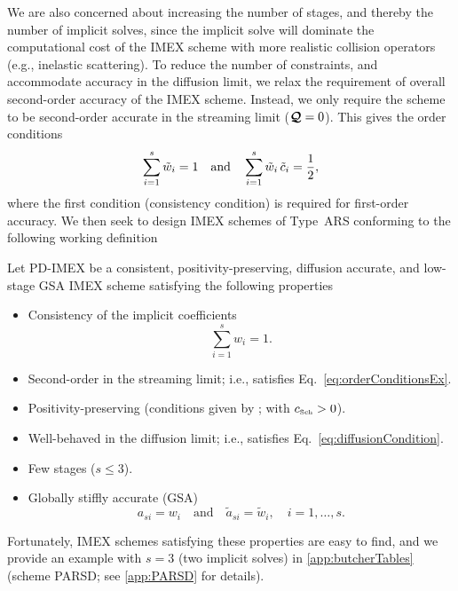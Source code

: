 We are also concerned about increasing the number of stages, and thereby the number of implicit solves, since the implicit solve will dominate the computational cost of the IMEX scheme with more realistic collision operators (e.g., inelastic scattering).  
To reduce the number of constraints, and accommodate accuracy in the diffusion limit, we relax the requirement of overall second-order accuracy of the IMEX scheme.  
Instead, we only require the scheme to be second-order accurate in the streaming limit ($\boldsymbol{\mathcal{Q}}=0$).  
This gives the order conditions
\begin{equation}
  \sum_{i=1}^{s}\tilde{w}_{i}=1
  \quad\text{and}\quad
  \sum_{i=1}^{s}\tilde{w}_{i}\,\tilde{c}_{i}=\frac{1}{2},
  \label{eq:orderConditionsEx}
\end{equation}
where the first condition (consistency condition) is required for first-order accuracy.  
We then seek to design IMEX schemes of Type~ARS conforming to the following working definition
\begin{define}
  Let PD-IMEX be a consistent, positivity-preserving, diffusion accurate, and low-stage GSA IMEX scheme satisfying the following properties
  \begin{itemize}
    \item Consistency of the implicit coefficients
    \begin{equation*}
      \sum_{i=1}^{s}w_{i}=1.
    \end{equation*}
    \item Second-order in the streaming limit; i.e., satisfies Eq.~\eqref{eq:orderConditionsEx}.
    \item Positivity-preserving (conditions given by \cite{hu_etal_2018}; with $c_{\mbox{\tiny Sch}}>0$).
    \item Well-behaved in the diffusion limit; i.e., satisfies Eq.~\eqref{eq:diffusionCondition}.
    \item Few stages ($s\le3$).
    \item Globally stiffly accurate (GSA)
    \begin{equation*}
      a_{si}=w_{i}\quad\text{and}\quad\tilde{a}_{si}=\tilde{w}_{i},\quad i=1,\ldots,s.
    \end{equation*}
  \end{itemize}
  \label{def:DIMEXP}
\end{define}
Fortunately, IMEX schemes satisfying these properties are easy to find, and we provide an example with $s=3$ (two implicit solves) in \ref{app:butcherTables} (scheme PARSD; see \ref{app:PARSD} for details).  
